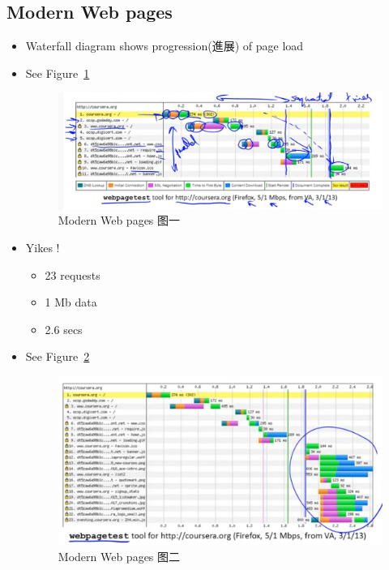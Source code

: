 \documentclass[12pt]{ctexart}   %
\begin{document}
	\subsection{Modern Web pages}
	\begin{itemize}
		\item Waterfall diagram shows progression(進展) of page load
		\item See Figure~\ref{fig:8-8-1}
		  
		 \begin{figure}[h!] %
		\centering
		 \includegraphics[scale=0.7]{images/8-8-1}
		\caption{ Modern Web pages 图一}
		 \label{fig:8-8-1}
		 \end{figure}
		 
		 \item Yikes !
		 \begin{itemize}
		 	\item 23 requests
		 	\item 1 Mb data
		 	\item 2.6 secs
		 \end{itemize}
		 \item See Figure~\ref{fig:8-8-2}
		  
		 \begin{figure}[h!] %
		\centering
		 \includegraphics[scale=0.7]{images/8-8-2}
		\caption{ Modern Web pages 图二}
		 \label{fig:8-8-2}
		 \end{figure}
		 

\end{itemize}
\end{document}
